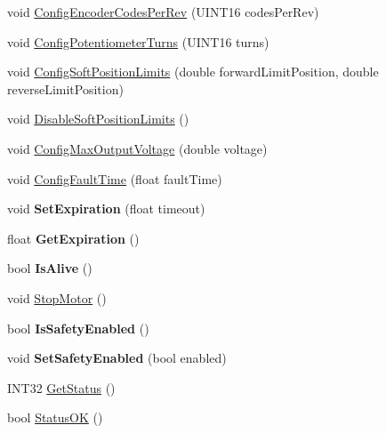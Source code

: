 \begin{DoxyCompactItemize}
\item 
void \hyperlink{class_l_r_t_c_a_n_jaguar_aa95167cfd586ead9991e4a58093a80df}{\-Config\-Encoder\-Codes\-Per\-Rev} (\-U\-I\-N\-T16 codes\-Per\-Rev)
\item 
void \hyperlink{class_l_r_t_c_a_n_jaguar_ad156de626965a5cb1010f7739e6be61c}{\-Config\-Potentiometer\-Turns} (\-U\-I\-N\-T16 turns)
\item 
void \hyperlink{class_l_r_t_c_a_n_jaguar_aa728b91585e77a6fd35de143410ceacb}{\-Config\-Soft\-Position\-Limits} (double forward\-Limit\-Position, double reverse\-Limit\-Position)
\item 
void \hyperlink{class_l_r_t_c_a_n_jaguar_a9ae520bb6946d9893975e7178ce0179b}{\-Disable\-Soft\-Position\-Limits} ()
\item 
void \hyperlink{class_l_r_t_c_a_n_jaguar_a7ac8f3ab7651bee6ac2e0f4c72dbcbaa}{\-Config\-Max\-Output\-Voltage} (double voltage)
\item 
void \hyperlink{class_l_r_t_c_a_n_jaguar_afcdf4cbbe499bad80480299e14cc85fb}{\-Config\-Fault\-Time} (float fault\-Time)
\item 
\hypertarget{class_l_r_t_c_a_n_jaguar_ae385e0e67ece23eaf7602f1099a717fc}{
void {\bfseries \-Set\-Expiration} (float timeout)}
\label{class_l_r_t_c_a_n_jaguar_ae385e0e67ece23eaf7602f1099a717fc}

\item 
\hypertarget{class_l_r_t_c_a_n_jaguar_af17de9f0015fb4c6963ebd2d3f86e0ad}{
float {\bfseries \-Get\-Expiration} ()}
\label{class_l_r_t_c_a_n_jaguar_af17de9f0015fb4c6963ebd2d3f86e0ad}

\item 
\hypertarget{class_l_r_t_c_a_n_jaguar_aa8b4231515de25c15aaf54999da61df2}{
bool {\bfseries \-Is\-Alive} ()}
\label{class_l_r_t_c_a_n_jaguar_aa8b4231515de25c15aaf54999da61df2}

\item 
void \hyperlink{class_l_r_t_c_a_n_jaguar_a520a2fd72b8813e0765a123c1efc4c22}{\-Stop\-Motor} ()
\item 
\hypertarget{class_l_r_t_c_a_n_jaguar_a4c0c6bd1119cf239071d3af00cc6a1e7}{
bool {\bfseries \-Is\-Safety\-Enabled} ()}
\label{class_l_r_t_c_a_n_jaguar_a4c0c6bd1119cf239071d3af00cc6a1e7}

\item 
\hypertarget{class_l_r_t_c_a_n_jaguar_a0df161342447735329123368e29d1ac8}{
void {\bfseries \-Set\-Safety\-Enabled} (bool enabled)}
\label{class_l_r_t_c_a_n_jaguar_a0df161342447735329123368e29d1ac8}

\item 
\-I\-N\-T32 \hyperlink{class_l_r_t_c_a_n_jaguar_aee5af81b66544bf73f94e50b8ce0c48f}{\-Get\-Status} ()
\item 
bool \hyperlink{class_l_r_t_c_a_n_jaguar_a8d2fcf5c949efeb916b012eeab35e099}{\-Status\-O\-K} ()
\end{DoxyCompactItemize}
